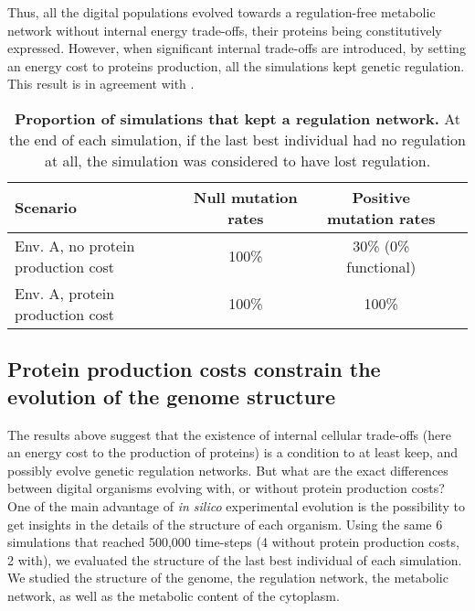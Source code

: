 Thus, all the digital populations evolved towards a regulation-free metabolic network without internal energy trade-offs, their proteins being constitutively expressed. However, when significant internal trade-offs are introduced, by setting an energy cost to proteins production, all the simulations kept genetic regulation. This result is in agreement with \cite{weisse-et-al-2015}.

\begin{table}[!ht]
\begin{adjustwidth}{-0in}{0in}
\centering
\caption[Proportion of simulations that kept a regulation network.]{{\bf Proportion of simulations that kept a regulation network.} At the end of each simulation, if the last best individual had no regulation at all, the simulation was considered to have lost regulation.}
\begin{tabular}{|l|c|c|c|}
\hline
Scenario & Null mutation rates & Positive mutation rates\\
\hline
Env. A, no protein production cost & 100\% & 30\% (0\% functional)\\
Env. A, protein production cost & 100\% & 100\%\\
\hline
\end{tabular}
\label{table:part2:second_result:keep_regulation_table}
\end{adjustwidth}
\end{table}


\subsection{Protein production costs constrain the evolution of the genome structure}
\label{subsec:part2:second_result:genome_structure}

The results above suggest that the existence of internal cellular trade-offs (here an energy cost to the production of proteins) is a condition to at least keep, and possibly evolve genetic regulation networks. But what are the exact differences between digital organisms evolving with, or without protein production costs? One of the main advantage of \textit{in silico} experimental evolution is the possibility to get insights in the details of the structure of each organism. Using the same 6 simulations that reached 500,000 time-steps (4 without protein production costs, 2 with), we evaluated the structure of the last best individual of each simulation. We studied the structure of the genome, the regulation network, the metabolic network, as well as the metabolic content of the cytoplasm.

